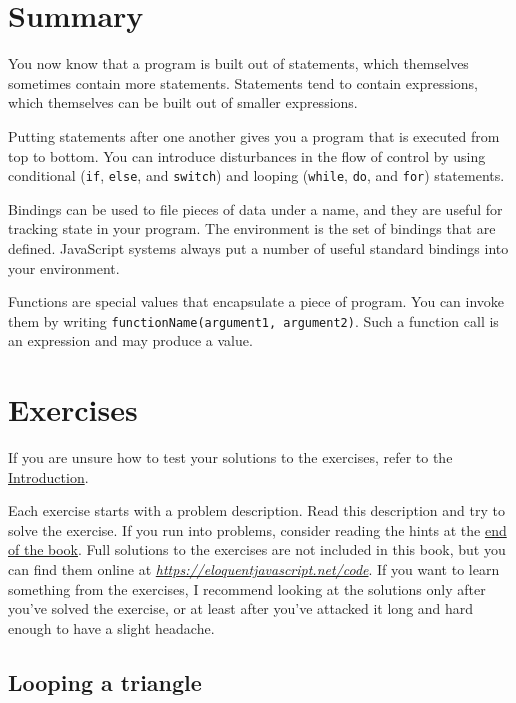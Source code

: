 \section{Summary}

You now know that a program is built out of statements, which themselves sometimes contain more statements. Statements tend to contain expressions, which themselves can be built out of smaller expressions.

Putting statements after one another gives you a program that is executed from top to bottom. You can introduce disturbances in the flow of control by using conditional (\lstinline`if`, \lstinline`else`, and \lstinline`switch`) and looping (\lstinline`while`, \lstinline`do`, and \lstinline`for`) statements.

Bindings can be used to file pieces of data under a name, and they are useful for tracking state in your program. The environment is the set of bindings that are defined. JavaScript systems always put a number of useful standard bindings into your environment.

Functions are special values that encapsulate a piece of program. You can invoke them by writing \lstinline`functionName(argument1, argument2)`. Such a function call is an expression and may produce a value.

\section{Exercises}

If you are unsure how to test your solutions to the exercises, refer to the \hyperref[intro]{Introduction}.

Each exercise starts with a problem description. Read this description and try to solve the exercise. If you run into problems, consider reading the hints at the \hyperref[hints]{end of the book}. Full solutions to the exercises are not included in this book, but you can find them online at \href{https://eloquentjavascript.net/code#2}{\emph{https://eloquentjavascript.net\slash code}}. If you want to learn something from the exercises, I recommend looking at the solutions only after you've solved the exercise, or at least after you've attacked it long and hard enough to have a slight headache.

\subsection{Looping a triangle}

